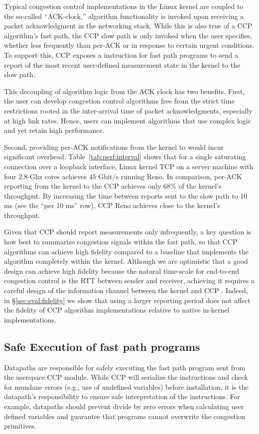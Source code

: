 Typical congestion control
implementations in the Linux kernel are coupled to the so-called ``ACK-clock,''
\ie algorithm functionality is invoked upon receiving a packet acknowledgment in
the networking stack.
%
While this is also true of a CCP algorithm's fast path, the CCP slow path is
only invoked when the user specifies, whether less frequently than per-ACK or in response to certain urgent conditions.
%
To support this, CCP exposes a  instruction for fast path programs to send a
report of the most recent user-defined measurement state in the kernel to the slow path.

This decoupling of algorithm logic from the ACK clock has two benefits.
%
First, the user can develop congestion control algorithms free from the strict
time restrictions rooted in the inter-arrival time of packet acknowledgments,
especially at high link rates.
Hence, users can implement algorithms that use complex logic and yet retain high performance.

Second, providing per-ACK notifications from the kernel to \userspace would incur
significant overhead.
%
Table~\ref{tab:perf:interval} shows that for a single saturating 
connection over a loopback interface, Linux kernel TCP on a server machine
with four 2.8-Ghz cores achieves $45$ Gbit/s running Reno.
%
In comparison, per-ACK reporting from the kernel to the CCP \userspace achieves
only 68\% of the kernel's throughput.
%
By increasing the time between reports sent to the slow path to 10 ms (see the
``per 10 ms'' row), CCP Reno achieves close to the kernel's throughput.

Given that CCP should report measurements only infrequently, a key question is
how best to summarize congestion signals within the fast path, so that CCP
algorithms can achieve high fidelity compared to a baseline that implements the
algorithm completely within the kernel.
Although we are optimistic that a good design can achieve high fidelity because the natural time-scale for end-to-end
congestion control is the RTT between sender and receiver,
achieving it requires a careful design of the information channel between the kernel and CCP \userspace.
Indeed, in \S\ref{sec:eval:fidelity} we show that using a
larger reporting period does not affect the fidelity of CCP algorithm
implementations relative to native in-kernel implementations.



\subsection{Safe Execution of fast path programs}
\label{s:datapath:fold}
Datapaths are responsible for safely executing the fast path program sent from the userspace CCP module. While CCP will serialize the instructions and check for mundane errors (e.g., use of undefined variables) before installation, it is the datapath’s responsibility to ensure safe interpretation of the instructions. For example, datapaths should prevent divide by zero errors when calculating user defined variables and guarantee that programs cannot overwrite the congestion primitives.

